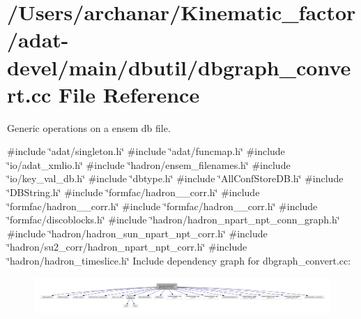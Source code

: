 \hypertarget{adat-devel_2main_2dbutil_2dbgraph__convert_8cc}{}\section{/\+Users/archanar/\+Kinematic\+\_\+factor/adat-\/devel/main/dbutil/dbgraph\+\_\+convert.cc File Reference}
\label{adat-devel_2main_2dbutil_2dbgraph__convert_8cc}


Generic operations on a ensem db file.  


{\ttfamily \#include \char`\"{}adat/singleton.\+h\char`\"{}}\newline
{\ttfamily \#include \char`\"{}adat/funcmap.\+h\char`\"{}}\newline
{\ttfamily \#include \char`\"{}io/adat\+\_\+xmlio.\+h\char`\"{}}\newline
{\ttfamily \#include \char`\"{}hadron/ensem\+\_\+filenames.\+h\char`\"{}}\newline
{\ttfamily \#include \char`\"{}io/key\+\_\+val\+\_\+db.\+h\char`\"{}}\newline
{\ttfamily \#include \char`\"{}dbtype.\+h\char`\"{}}\newline
{\ttfamily \#include \char`\"{}All\+Conf\+Store\+D\+B.\+h\char`\"{}}\newline
{\ttfamily \#include \char`\"{}D\+B\+String.\+h\char`\"{}}\newline
{\ttfamily \#include \char`\"{}formfac/hadron\+\_\+1pt\+\_\+corr.\+h\char`\"{}}\newline
{\ttfamily \#include \char`\"{}formfac/hadron\+\_\+2pt\+\_\+corr.\+h\char`\"{}}\newline
{\ttfamily \#include \char`\"{}formfac/hadron\+\_\+3pt\+\_\+corr.\+h\char`\"{}}\newline
{\ttfamily \#include \char`\"{}formfac/discoblocks.\+h\char`\"{}}\newline
{\ttfamily \#include \char`\"{}hadron/hadron\+\_\+npart\+\_\+npt\+\_\+conn\+\_\+graph.\+h\char`\"{}}\newline
{\ttfamily \#include \char`\"{}hadron/hadron\+\_\+sun\+\_\+npart\+\_\+npt\+\_\+corr.\+h\char`\"{}}\newline
{\ttfamily \#include \char`\"{}hadron/su2\+\_\+corr/hadron\+\_\+npart\+\_\+npt\+\_\+corr.\+h\char`\"{}}\newline
{\ttfamily \#include \char`\"{}hadron/hadron\+\_\+timeslice.\+h\char`\"{}}\newline
Include dependency graph for dbgraph\+\_\+convert.\+cc\+:
\nopagebreak
\begin{figure}[H]
\begin{center}
\leavevmode
\includegraphics[width=350pt]{d3/d46/adat-devel_2main_2dbutil_2dbgraph__convert_8cc__incl}
\end{center}
\end{figure}

